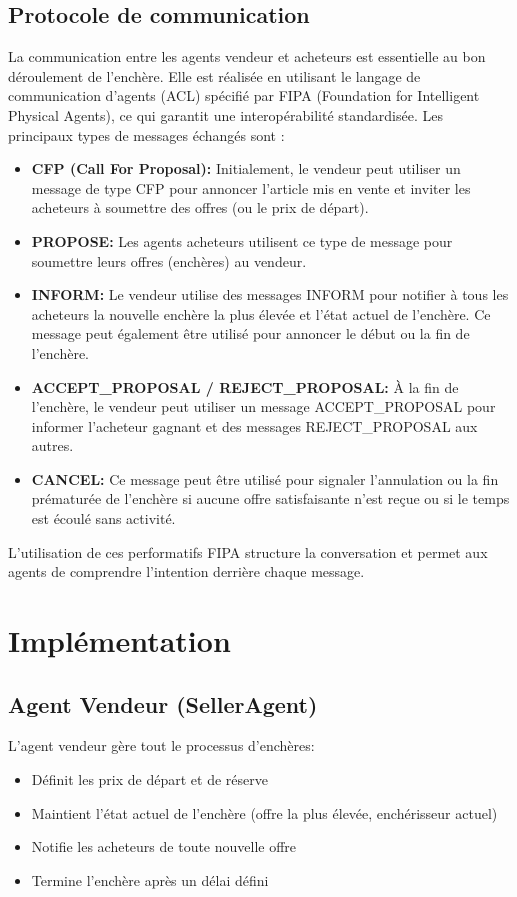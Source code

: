 \documentclass[a4paper,12pt]{report}
\begin{document}
\subsection{Protocole de communication}
La communication entre les agents vendeur et acheteurs est essentielle au bon déroulement de l'enchère. Elle est réalisée en utilisant le langage de communication d'agents (ACL) spécifié par FIPA (Foundation for Intelligent Physical Agents), ce qui garantit une interopérabilité standardisée. Les principaux types de messages échangés sont :
\begin{itemize}
    \item \textbf{CFP (Call For Proposal):} Initialement, le vendeur peut utiliser un message de type CFP pour annoncer l'article mis en vente et inviter les acheteurs à soumettre des offres (ou le prix de départ).
    \item \textbf{PROPOSE:} Les agents acheteurs utilisent ce type de message pour soumettre leurs offres (enchères) au vendeur.
    \item \textbf{INFORM:} Le vendeur utilise des messages INFORM pour notifier à tous les acheteurs la nouvelle enchère la plus élevée et l'état actuel de l'enchère. Ce message peut également être utilisé pour annoncer le début ou la fin de l'enchère.
    \item \textbf{ACCEPT\_PROPOSAL / REJECT\_PROPOSAL:} À la fin de l'enchère, le vendeur peut utiliser un message ACCEPT\_PROPOSAL pour informer l'acheteur gagnant et des messages REJECT\_PROPOSAL aux autres.
    \item \textbf{CANCEL:} Ce message peut être utilisé pour signaler l'annulation ou la fin prématurée de l'enchère si aucune offre satisfaisante n'est reçue ou si le temps est écoulé sans activité.
\end{itemize}
L'utilisation de ces performatifs FIPA structure la conversation et permet aux agents de comprendre l'intention derrière chaque message.

\section{Implémentation}
\subsection{Agent Vendeur (SellerAgent)}
L'agent vendeur gère tout le processus d'enchères:
\begin{itemize}
    \item Définit les prix de départ et de réserve
    \item Maintient l'état actuel de l'enchère (offre la plus élevée, enchérisseur actuel)
    \item Notifie les acheteurs de toute nouvelle offre
    \item Termine l'enchère après un délai défini
\end{itemize}
\end{document}
